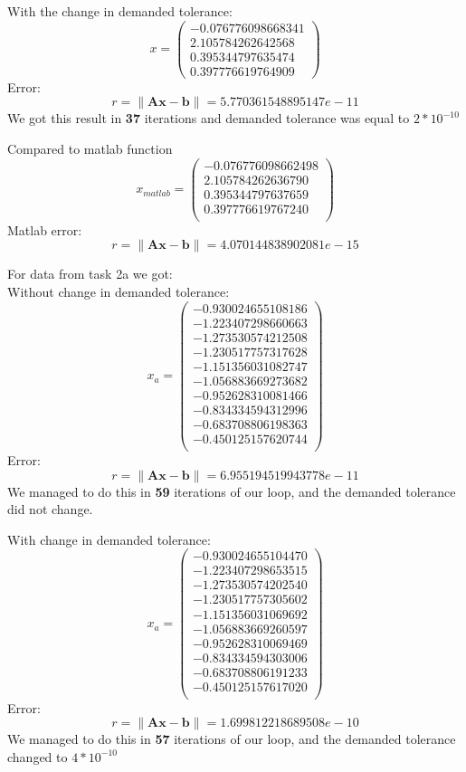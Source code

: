\documentclass[12pt]{report}
\begin{document}
With the change in demanded tolerance:
\[ x = \left( \begin{array}{cc}
  -0.076776098668341 \\
   2.105784262642568 \\
   0.395344797635474 \\
   0.397776619764909
\end{array} \right)
\]
Error:
\[ r = \| \mathbf{A}\mathbf{x} - \mathbf{b}\| = 5.770361548895147e-11 \]
We got this result in \textbf{37} iterations and demanded tolerance was equal to $2*10^{-10}$

Compared to matlab function
\[ x_{matlab} = \left( \begin{array}{cc}
  -0.076776098662498 \\
   2.105784262636790 \\
   0.395344797637659 \\
   0.397776619767240 \\
\end{array} \right)
\]
Matlab error:
\[ r = \| \mathbf{A}\mathbf{x} - \mathbf{b}\| = 4.070144838902081e-15 \]

\newpage
For data from task 2a we got: \\
Without change in demanded tolerance:
\[ x_a = \left( \begin{array}{cc}
-0.930024655108186 \\
-1.223407298660663 \\
-1.273530574212508 \\
-1.230517757317628 \\
-1.151356031082747 \\
-1.056883669273682 \\
-0.952628310081466 \\
-0.834334594312996 \\
-0.683708806198363 \\
-0.450125157620744 \\
\end{array} \right)
\]
Error:
\[ r = \| \mathbf{A}\mathbf{x} - \mathbf{b}\| = 6.955194519943778e-11 \]
We managed to do this in \textbf{59} iterations of our loop, and the demanded tolerance did not change.

With change in demanded tolerance:
\[ x_a = \left( \begin{array}{cc}
-0.930024655104470 \\
-1.223407298653515 \\
-1.273530574202540 \\
-1.230517757305602 \\
-1.151356031069692 \\
-1.056883669260597 \\
-0.952628310069469 \\
-0.834334594303006 \\
-0.683708806191233 \\
-0.450125157617020 \\
\end{array} \right)
\]
Error:
\[ r = \| \mathbf{A}\mathbf{x} - \mathbf{b}\| = 1.699812218689508e-10 \]
We managed to do this in \textbf{57} iterations of our loop, and the demanded tolerance changed to $4*10^{-10}$
\end{document}
